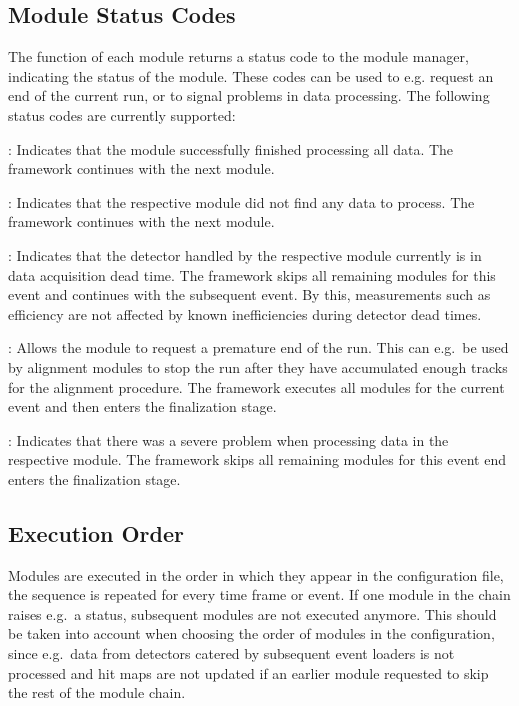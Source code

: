 \subsection{Module Status Codes}

The  function of each module returns a status code to the module manager, indicating the status of the module.
These codes can be used to e.g. request an end of the current run, or to signal problems in data processing.
The following status codes are currently supported:

\begin{description}
    \item{}: Indicates that the module successfully finished processing all data. The framework continues with the next module.
    \item{}: Indicates that the respective module did not find any data to process. The framework continues with the next module.
    \item{}: Indicates that the detector handled by the respective module currently is in data acquisition dead time. The framework skips all remaining modules for this event and continues with the subsequent event. By this, measurements such as efficiency are not affected by known inefficiencies during detector dead times.
    \item{}: Allows the module to request a premature end of the run. This can e.g.\ be used by alignment modules to stop the run after they have accumulated enough tracks for the alignment procedure. The framework executes all modules for the current event and then enters the finalization stage.
    \item{}: Indicates that there was a severe problem when processing data in the respective module. The framework skips all remaining modules for this event end enters the finalization stage.
\end{description}

\subsection{Execution Order}

Modules are executed in the order in which they appear in the configuration file, the sequence is repeated for every time frame or event.
If one module in the chain raises e.g.\ a  status, subsequent modules are not executed anymore.
This should be taken into account when choosing the order of modules in the configuration, since e.g.\ data from detectors catered by subsequent event loaders is not processed and hit maps are not updated if an earlier module requested to skip the rest of the module chain.

